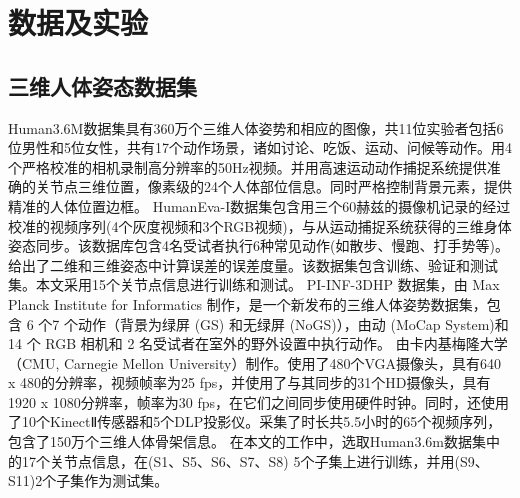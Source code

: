 \section{数据及实验}
\subsection{三维人体姿态数据集}{}
Human3.6M数据集具有360万个三维人体姿势和相应的图像，共11位实验者包括6位男性和5位女性，共有17个动作场景，诸如讨论、吃饭、运动、问候等动作。用4个严格校准的相机录制高分辨率的50Hz视频。并用高速运动动作捕捉系统提供准确的关节点三维位置，像素级的24个人体部位信息。同时严格控制背景元素，提供精准的人体位置边框。
HumanEva-I数据集包含用三个60赫兹的摄像机记录的经过校准的视频序列(4个灰度视频和3个RGB视频)，与从运动捕捉系统获得的三维身体姿态同步。该数据库包含4名受试者执行6种常见动作(如散步、慢跑、打手势等)。给出了二维和三维姿态中计算误差的误差度量。该数据集包含训练、验证和测试集。本文采用15个关节点信息进行训练和测试。
PI-INF-3DHP 数据集，由 Max Planck Institute for Informatics 制作，是一个新发布的三维人体姿势数据集，包含 6 个7 个动作（背景为绿屏 (GS) 和无绿屏 (NoGS)），由动 (MoCap System)和 14 个 RGB 相机和 2 名受试者在室外的野外设置中执行动作。
由卡内基梅隆大学（CMU, Carnegie Mellon University）制作。使用了480个VGA摄像头，具有640 x 480的分辨率，视频帧率为25 fps，并使用了与其同步的31个HD摄像头，具有1920 x 1080分辨率，帧率为30 fps，在它们之间同步使用硬件时钟。同时，还使用了10个KinectⅡ传感器和5个DLP投影仪。采集了时长共5.5小时的65个视频序列，包含了150万个三维人体骨架信息。
在本文的工作中，选取Human3.6m数据集中的17个关节点信息，在(S1、S5、S6、S7、S8) 5个子集上进行训练，并用(S9、S11)2个子集作为测试集。

